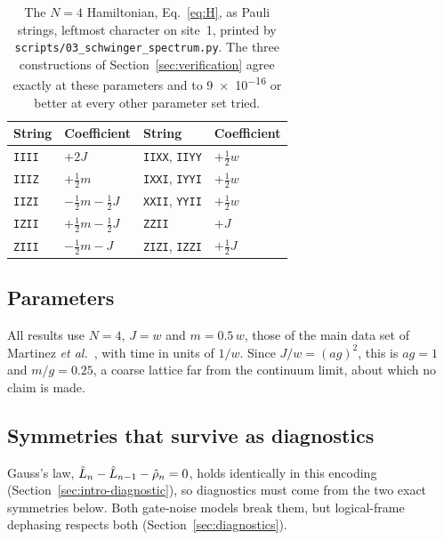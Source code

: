 \begin{table}[t]
  \centering
  \caption{The $N=4$ Hamiltonian, Eq.~\eqref{eq:H}, as Pauli strings, leftmost
  character on site~1, printed by \texttt{scripts/03\_schwinger\_spectrum.py}.
  The three constructions of Section~\ref{sec:verification} agree exactly at
  these parameters and to \num{9e-16} or better at every other parameter set
  tried.}
  \label{tab:pauli}
  \small
  \begin{tabular}{llll}
    \toprule
    String & Coefficient & String & Coefficient \\
    \midrule
    \texttt{IIII} & $+2J$                      & \texttt{IIXX}, \texttt{IIYY} & $+\tfrac12 w$ \\
    \texttt{IIIZ} & $+\tfrac12 m$              & \texttt{IXXI}, \texttt{IYYI} & $+\tfrac12 w$ \\
    \texttt{IIZI} & $-\tfrac12 m - \tfrac12 J$ & \texttt{XXII}, \texttt{YYII} & $+\tfrac12 w$ \\
    \texttt{IZII} & $+\tfrac12 m - \tfrac12 J$ & \texttt{ZZII}                & $+J$ \\
    \texttt{ZIII} & $-\tfrac12 m - J$          & \texttt{ZIZI}, \texttt{IZZI} & $+\tfrac12 J$ \\
    \bottomrule
  \end{tabular}
\end{table}

\subsection{Parameters}
\label{sec:parameters}

All results use $N = 4$, $J = w$ and $m = 0.5\,w$, those of the main data set
of Martinez \emph{et al.}~\cite{martinez2016}, with time in units of $1/w$.
Since $J/w = (ag)^2$, this is $ag = 1$ and $m/g = 0.25$, a coarse lattice far
from the continuum limit, about which no claim is made.

\subsection{Symmetries that survive as diagnostics}
\label{sec:symmetries}

Gauss's law, $\hat{L}_{n} - \hat{L}_{n-1} - \hat\rho_n = 0$, holds identically in this
encoding (Section~\ref{sec:intro-diagnostic}), so diagnostics must come from
the two exact symmetries below. Both gate-noise models break them, but
logical-frame dephasing respects both (Section~\ref{sec:diagnostics}).

